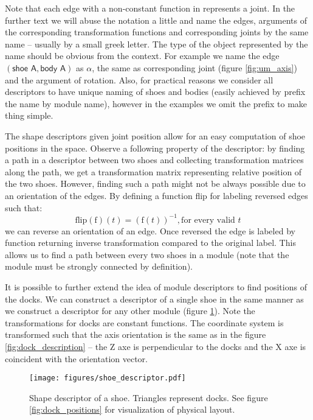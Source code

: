 Note that each edge with a non-constant function in represents a joint. In the
further text we will abuse the notation a little and name the edges, arguments
of the corresponding transformation functions and corresponding joints by the
same name -- usually by a small greek letter. The type of the object represented
by the name should be obvious from the context. For example we name the edge
$(\textsf{shoe A}, \textsf{body A})$ as $\alpha$, the same as corresponding
joint (figure \ref{fig:um_axis}) and the argument of rotation. Also, for
practical reasons we consider all descriptors to have unique naming of shoes and
bodies (easily achieved by prefix the name by module name), however in the
examples we omit the prefix to make thing simple.

The shape descriptors given joint position allow for an easy computation of shoe
positions in the space. Observe a following property of the descriptor: by
finding a path in a descriptor between two shoes and collecting transformation
matrices along the path, we get a transformation matrix representing relative
position of the two shoes. However, finding such a path might not be always
possible due to an orientation of the edges. By defining a function flip for
labeling reversed edges such that:
\[\text{flip}(\text{f})(t) = (\text{f}(t))^{-1}, \text{for every valid } t\] we
can reverse an orientation of an edge. Once reversed the edge is labeled by
function returning inverse transformation compared to the original label. This
allows us to find a path between every two shoes in a module (note that the
module must be strongly connected by definition).

It is possible to  further extend the idea of module descriptors to find
positions of the docks.  We can construct a descriptor of a single shoe in the
same manner as we construct a descriptor for any other module (figure
\ref{fig:shoe_descriptor}). Note the transformations for docks are constant
functions. The coordinate system is transformed such that the axis orientation
is the same as in the figure \ref{fig:dock_description} -- the Z axe is
perpendicular to the docks and the X axe is coincident with the orientation
vector.

\begin{figure}[h!]
    \centering
    \texttt{[image: figures/shoe\_descriptor.pdf]}
    \caption{Shape descriptor of a shoe. Triangles represent docks. See figure
    \ref{fig:dock_positions} for visualization of physical layout.}
    \label{fig:shoe_descriptor}
\end{figure}

